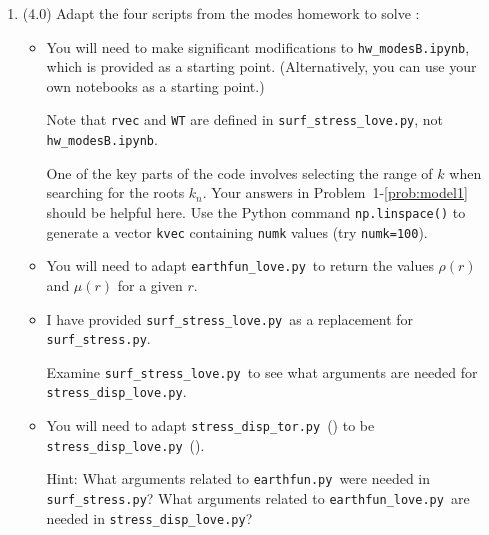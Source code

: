 \documentclass[11pt,titlepage,fleqn]{article}
\newcommand{\tfiless}{{\tt surf\_stress.py}}
\newcommand{\tfilesdt}{{\tt stress\_disp\_tor.py}}
\newcommand{\tfileef}{{\tt earthfun.py}}
\newcommand{\tfilemainB}{{\tt hw\_modesB.ipynb}}
\newcommand{\tfilessB}{{\tt surf\_stress\_love.py}}
\newcommand{\tfilesdtB}{{\tt stress\_disp\_love.py}}
\newcommand{\tfileefB}{{\tt earthfun\_love.py}}
\begin{document}
\begin{enumerate}

\item (4.0) Adapt the four scripts from the modes homework to solve :
%
\begin{itemize}
\item You will need to make significant modifications to \tfilemainB, which is provided as a starting point. (Alternatively, you can use your own notebooks as a starting point.)

%
%
Note that \verb+rvec+ and \verb+WT+ are defined in \tfilessB, not \tfilemainB.

One of the key parts of the code involves selecting the range of $k$ when searching for the roots $k_n$.
Your answers in Problem~1-\ref{prob:model1} should be helpful here.
Use the Python command \verb+np.linspace()+ to generate a vector \verb+kvec+ containing \verb+numk+ values (try \verb+numk=100+).

\item You will need to adapt \tfileefB\ to return the values $\rho(r)$ and $\mu(r)$ for a given $r$.

\item I have provided \tfilessB\ as a replacement for \tfiless.

Examine \tfilessB\ to see what arguments are needed for \tfilesdtB.

\item You will need to adapt \tfilesdt\ () to be \tfilesdtB\ ().

Hint: What arguments related to \tfileef\ were needed in \tfiless? What arguments related to \tfileefB\ are needed in \tfilesdtB?

\end{itemize}


\end{enumerate}
\end{document}
